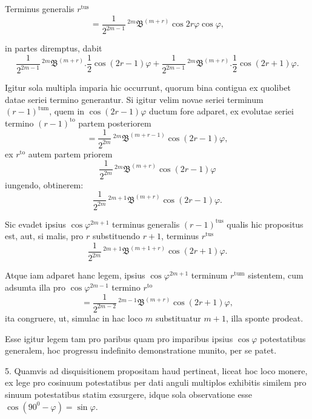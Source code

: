 \par\noindent{}%
\hspace*{\parindent}Terminus generalis $r^{\text{tus}}$
\[
= \frac{1}{2^{2m-1}}\,{}^{2m}\mathfrak{B}^{(m+r)}\cos 2r\varphi\cos\varphi,
\]
\par\noindent in partes diremptus, dabit
\[
\frac{1}{2^{2m-1}}\,{}^{2m}\mathfrak{B}^{(m+r)} . \frac{1}{2}\cos(2r-1)\varphi
+ \frac{1}{2^{2m-1}}\,{}^{2m}\mathfrak{B}^{(m+r)} . \frac{1}{2}\cos(2r+1)\varphi.
\]

\par\noindent Igitur sola multipla imparia hic occurrunt, quorum bina contigua ex quolibet
datae seriei termino generantur. Si igitur velim novae seriei terminum
$(r-1)^{\text{tum}}$, quem in $\cos(2r-1)\varphi$ ductum fore adparet, ex
evolutae seriei termino $(r-1)^{\text{to}}$ partem posteriorem
\[
= \frac{1}{2^{2m}}\,{}^{2m}\mathfrak{B}^{(m+r-1)}\cos(2r-1)\varphi,
\]
ex $r^{\text{to}}$ autem partem priorem
\[
\frac{1}{2^{2m}}\,{}^{2m}\mathfrak{B}^{(m+r)}\cos(2r-1)\varphi
\]
iungendo, obtinerem:
\[
\frac{1}{2^{2m}}\,{}^{2m+1}\mathfrak{B}^{(m+r)}\cos(2r-1)\varphi.
\]

\par\noindent Sic evadet ipsius $\cos\varphi^{2m+1}$ terminus generalis $(r-1)^{\text{tus}}$
qualis hic propositus est, aut, si malis, pro $r$ substituendo $r+1$, terminus
$r^{\text{tus}}$
\[
\frac{1}{2^{2m}}\,{}^{2m+1}\mathfrak{B}^{(m+1+r)}\cos(2r+1)\varphi.
\]

\par\noindent Atque iam adparet hanc legem, ipsius $\cos\varphi^{2m+1}$ terminum
$r^{\text{tum}}$ sistentem, cum adsumta illa pro $\cos\varphi^{2m-1}$ termino
$r^{\text{to}}$
\[
= \frac{1}{2^{2m-2}}\,{}^{2m-1}\mathfrak{B}^{(m+r)}\cos(2r+1)\varphi,
\]
ita congruere, ut, simulac in hac loco $m$ substituatur $m+1$, illa sponte
prodeat.

\par\noindent\hspace*{\parindent}Esse igitur legem tam pro paribus quam pro imparibus ipsius $\cos\varphi$
potestatibus generalem, hoc progressu indefinito demonstratione munito, per se
patet.

5. Quamvis ad disquisitionem propositam haud pertineat, liceat hoc loco
monere, ex lege pro cosinuum potestatibus per dati anguli multiplos exhibitis
similem pro sinuum potestatibus statim exsurgere, idque sola observatione esse
$\cos(90^0-\varphi) = \sin\varphi$.
